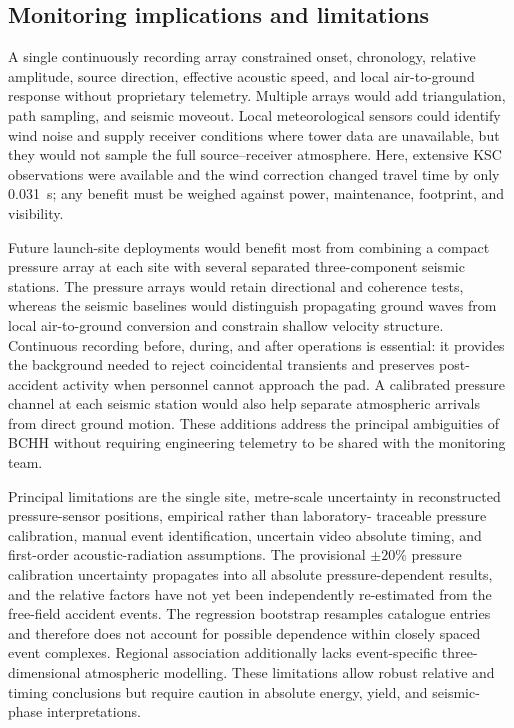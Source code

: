 \documentclass[]{seismica}
\begin{document}
\subsection{Monitoring implications and limitations}

A single continuously recording array constrained onset, chronology, relative
amplitude, source direction, effective acoustic speed, and local air-to-ground
response without proprietary telemetry. Multiple arrays would add
triangulation, path sampling, and seismic moveout. Local meteorological sensors
could identify wind noise and supply receiver conditions where tower data are
unavailable, but they would not sample the full source--receiver atmosphere.
Here, extensive KSC observations were available and the wind correction changed
travel time by only 0.031~s; any benefit must be weighed against power,
maintenance, footprint, and visibility.

Future launch-site deployments would benefit most from combining a compact
pressure array at each site with several separated three-component seismic
stations. The pressure arrays would retain directional and coherence tests,
whereas the seismic baselines would distinguish propagating ground waves from
local air-to-ground conversion and constrain shallow velocity structure.
Continuous recording before, during, and after operations is essential: it
provides the background needed to reject coincidental transients and preserves
post-accident activity when personnel cannot approach the pad. A calibrated
pressure channel at each seismic station would also help separate atmospheric
arrivals from direct ground motion. These additions address the principal
ambiguities of BCHH without requiring engineering telemetry to be shared with
the monitoring team.

Principal limitations are the single site, metre-scale uncertainty in
reconstructed pressure-sensor positions, empirical rather than laboratory-
traceable pressure calibration, manual event identification, uncertain video
absolute timing, and first-order acoustic-radiation assumptions. The provisional
$\pm20\%$ pressure calibration uncertainty propagates into all absolute
pressure-dependent results, and the relative factors have not yet been
independently re-estimated from the free-field accident events. The regression
bootstrap resamples catalogue entries and therefore does not account for
possible dependence within closely spaced event complexes. Regional
association additionally lacks event-specific three-dimensional atmospheric
modelling. These limitations allow robust relative and timing conclusions but
require caution in absolute energy, yield, and seismic-phase interpretations.
\end{document}
